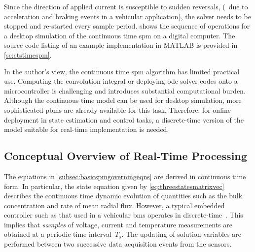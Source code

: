Since  the direction  of applied  current  is susceptible  to sudden  reversals,
(\eg~due  to  acceleration  and  braking events  in  a  vehicular  application),
the  solver   needs  to   be  stopped  and   re-started  every   sample  period.
 shows the sequence of  operations for a desktop simulation
of  the  continuous time  \gls{spm}  on  a  digital  computer. The  source  code
listing  of  an  example  implementation   in  \textsc{MATLAB}  is  provided  in
\cref{sc:ctstimespm}.



In  the author's  view,  the  continuous time  \gls{spm}  algorithm has  limited
practical  use.  Computing  the  convolution  integral  or  deploying  \gls{ode}
solver codes  onto a microcontroller  is challenging and  introduces substantial
computational burden. Although the continuous time model can be used for desktop
simulation, more sophisticated \glspl{pbm} are  already available for this task.
Therefore,  for online  deployment  in  state estimation  and  control tasks,  a
discrete-time  version of  the model  suitable for  real-time implementation  is
needed.


\subsection{Conceptual Overview of Real-Time Processing}

The   equations   in    \cref{subsec:basicspmgoverningeqns}   are   derived   in
continuous   time   form.  In   particular,   the   state  equation   given   by
\cref{eq:threestatesmatrixvec} describes  the continuous time  dynamic evolution
of  quantities such  as the  bulk concentration  and rate  of mean  radial flux.
However,  a  typical embedded  controller  such  as  that  used in  a  vehicular
\gls{bms}  operates   in  discrete-time~\cite{Andrea2010}.  This   implies  that
\emph{samples} of voltage, current and  temperature measurements are obtained at
a periodic time interval~$T_s$. The updating of solution variables are performed
between two successive data acquisition events from the sensors.



